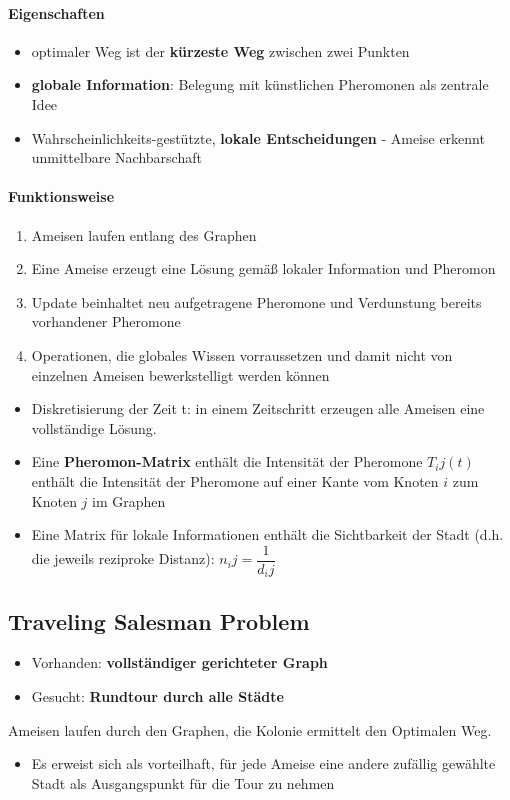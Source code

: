 \paragraph{Eigenschaften}
\begin{itemize}
	\item optimaler Weg ist der \textbf{kürzeste Weg} zwischen zwei Punkten
	\item \textbf{globale Information}: Belegung mit künstlichen Pheromonen als zentrale Idee
	\item Wahrscheinlichkeits-gestützte, \textbf{lokale Entscheidungen} - Ameise erkennt unmittelbare Nachbarschaft
\end{itemize}
\paragraph{Funktionsweise}
\begin{enumerate}
	\item Ameisen laufen entlang des Graphen
	\item Eine Ameise erzeugt eine Lösung gemäß lokaler Information und Pheromon
	\item Update beinhaltet neu aufgetragene Pheromone und Verdunstung bereits vorhandener Pheromone
	\item Operationen, die globales Wissen vorraussetzen und damit nicht von einzelnen Ameisen bewerkstelligt werden können
\end{enumerate}
\begin{itemize}
	\item Diskretisierung der Zeit t: in einem Zeitschritt erzeugen alle Ameisen eine vollständige Lösung.
	\item Eine \textbf{Pheromon-Matrix} enthält die  Intensität der Pheromone $T_ij(t)$ enthält die Intensität der Pheromone auf einer Kante vom Knoten $i$ zum Knoten $j$ im Graphen
	\item Eine Matrix für lokale Informationen enthält die Sichtbarkeit der Stadt (d.h. die jeweils reziproke Distanz): $n_ij = \dfrac{1 }{d_ij}$
\end{itemize}
\subsection{Traveling Salesman Problem}
\begin{itemize}
	\item Vorhanden: \textbf{vollständiger gerichteter Graph}
	\item Gesucht: \textbf{Rundtour durch alle Städte}
\end{itemize}
Ameisen laufen durch den Graphen, die Kolonie ermittelt den Optimalen Weg.
\begin{itemize}
	\item Es erweist sich als vorteilhaft, für jede Ameise eine andere zufällig gewählte Stadt als Ausgangspunkt für die Tour zu nehmen
\end{itemize}
